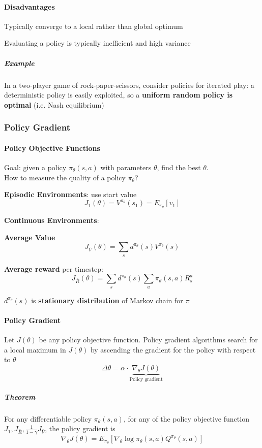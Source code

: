 \documentclass[10pt]{report}
\begin{document}
\paragraph{Disadvantages}
\begin{list}{}{}
	\item Typically converge to a local rather than global optimum
	\item Evaluating a policy is typically inefficient and high variance
\end{list}
\subparagraph{Example} In a two-player game of rock-paper-scissors, consider policies for iterated play: a deterministic policy is easily exploited, so a \textbf{uniform random policy is optimal} (i.e. Nash equilibrium)
\subsubsection{Policy Gradient}
\paragraph{Policy Objective Functions} Goal: given a policy $\pi_\theta(s,a)$ with parameters $\theta$, find the best $\theta$.\\
How to measure the quality of a policy $\pi_\theta$?
\begin{list}{}{}
	\item \textbf{Episodic Environments}: use start value
	$$J_1(\theta) = V^{\pi_\theta}(s_1) = E_{\pi_\theta}[v_1]$$
	\item \textbf{Continuous Environments}:
	\begin{list}{}{}
		\item \textbf{Average Value} $$J_{\overline{V}}(\theta) = \sum_s d^{\pi_\theta}(s)V^{\pi_\theta}(s)$$
		\item \textbf{Average reward} per timestep: $$J_{\overline{R}}(\theta) = \sum_s d^{\pi_\theta}(s)\sum_a\pi_\theta(s,a)R_s^a$$
		\item $d^{\pi_\theta}(s)$ is \textbf{stationary distribution} of Markov chain for $\pi$
	\end{list}
\end{list}
\paragraph{Policy Gradient} Let $J(\theta)$ be any policy objective function. Policy gradient algorithms search for a local maximum in $J(\theta)$ by ascending the gradient for the policy with respect to $\theta$
$$\Delta\theta=\alpha\cdot\underset{\text{Policy gradient}}{\underbrace{\nabla_\theta J(\theta)}}$$
\subparagraph{Theorem} For any differentiable policy $\pi_\theta(s,a)$, for any of the policy objective function $J_1,J_{\overline{R}},\frac{1}{1-\gamma}J_{\overline{V}}$, the policy gradient is
$$\nabla_\theta J(\theta)= E_{\pi_\theta}\left[\nabla_\theta\log\pi_\theta(s,a)Q^{\pi_\theta}(s,a)\right]$$
\end{document}
